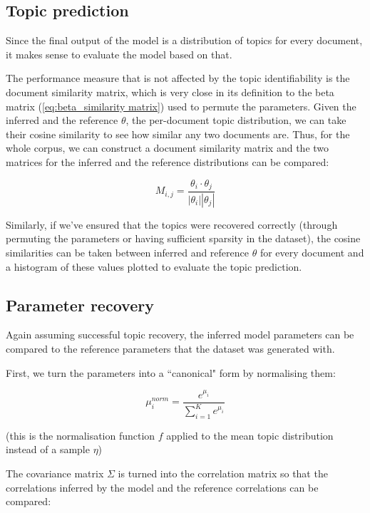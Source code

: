 \documentclass[12pt,a4paper,twoside,openright]{report}
\begin{document}
\subsection{Topic prediction}

Since the final output of the model is a distribution of topics for every document, it makes sense to evaluate the model based on that.

The performance measure that is not affected by the topic identifiability is the document similarity matrix, which is very close in its definition to the beta matrix (\ref{eq:beta_similarity matrix}) used to permute the parameters. Given the inferred and the reference $\theta$, the per-document topic distribution, we can take their cosine similarity to see how similar any two documents are. Thus, for the whole corpus, we can construct a document similarity matrix and the two matrices for the inferred and the reference distributions can be compared:

\begin{equation}\label{eq:document_similarity_matrix}
M_{i,j} = \frac{\theta_i \cdot \theta_j}{|\theta_i||\theta_j|}
\end{equation}

Similarly, if we've ensured that the topics were recovered correctly (through permuting the parameters or having sufficient sparsity in the dataset), the cosine similarities can be taken between inferred and reference $\theta$ for every document and a histogram of these values plotted to evaluate the topic prediction.

\subsection{Parameter recovery}

Again assuming successful topic recovery, the inferred model parameters can be compared to the reference parameters that the dataset was generated with.

First, we turn the parameters into a ``canonical" form by normalising them:

\begin{equation}
\mu^{norm}_i = \frac{e^{\mu_i}}{\sum\limits_{i=1}^K{e^{\mu_i}}}
\end{equation}

(this is the normalisation function $f$ applied to the mean topic distribution instead of a sample $\eta$)

The covariance matrix $\Sigma$ is turned into the correlation matrix so that the correlations inferred by the model and the reference correlations can be compared:
\end{document}
